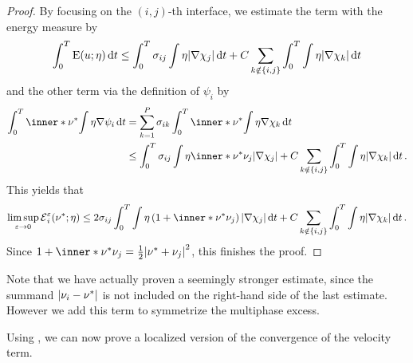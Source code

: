 \begin{proof}
	By focusing on the $ ( i, j )$-th interface, we estimate the term with the 
	energy measure by
	\begin{equation*}
		\int_{ 0 }^{ T }
		\operatorname{E} ( u ; \eta )
		\dd{ t }
		\leq
		\int_{ 0 }^{ T }
		\sigma_{ i j }
		\int
		\eta
		\abs{ \nabla \chi_{ j } }
		\dd{ t }
		+
		C \sum_{ k \notin \{ i , j \} }
		\int_{ 0 }^{ T }
		\int
		\eta
		\abs{ \nabla \chi_{ k } }
		\dd{ t }
	\end{equation*}
	and the other term via the definition of $ \psi_{ i } $ by 
	\begin{align*}
		\int_{ 0 }^{ T }
		\inner*{ \nu^{ \ast } }
		{
			\int
			\eta
			\nabla \psi_{ i }
		}
		\dd{ t }
		& =
		\sum_{ k = 1 }^{ P }
		\sigma_{ i k }
		\int_{ 0 }^{ T }
		\inner*{ \nu^{ \ast } }
		{
			\int
			\eta 
			\nabla \chi_{ k }
		}
		\dd{ t }
		\\
		& \leq
		\int_{ 0 }^{ T }
		\sigma_{ i j }
		\int
		\eta
		\inner*{ \nu^{ \ast } }{ \nu_{ j } }
		\abs{ \nabla \chi_{ j } }
		+
		C \sum_{ k \notin \{ i , j \} }
		\int_{ 0 }^{ T }
		\int
		\eta
		\abs{ \nabla \chi_{ k } }
		\dd{ t }.
	\end{align*}
	This yields that
	\begin{equation*}
		\limsup_{ \varepsilon \to 0 }
		\tilt_excess_{ i }^{ \varepsilon } ( \nu^{ \ast } ; \eta )
		\leq
		2 \sigma_{ i j } \int_{ 0 }^{ T }
		\int
		\eta
		\left( 1 + \inner*{ \nu^{ \ast } }{ \nu_{ j } } \right)
		\abs{ \nabla \chi_{ j } }
		\dd{ t }
		+
		C \sum_{ k \notin \{ i , j \} }
		\int_{ 0 }^{ T }
		\int
		\eta 
		\abs{ \nabla \chi_{ k } }
		\dd{ t }.
	\end{equation*}
	Since $ 1 + \inner*{ \nu^{ \ast } }{ \nu_{ j } } = \frac{ 1 }{ 2 } \abs{ 
		\nu^{ \ast } + \nu_{ j } }^{ 2 } $, this finishes the proof.
\end{proof}

Note that we have actually proven a seemingly stronger estimate, since the 
summand $ \abs{ \nu_{ i } - \nu^{ \ast } } $ is not included on the right-hand 
side of the last estimate. However we add this term to symmetrize the 
multiphase excess.

Using , we can 
now prove a localized version of the convergence of the velocity term.


